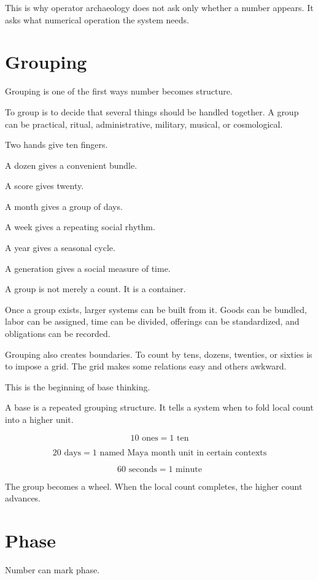 \documentclass[11pt]{book}
\begin{document}
This is why operator archaeology does not ask only whether a number appears. It asks what numerical operation the system needs.

\section{Grouping}

Grouping is one of the first ways number becomes structure.

To group is to decide that several things should be handled together. A group can be practical, ritual, administrative, military, musical, or cosmological.

Two hands give ten fingers.

A dozen gives a convenient bundle.

A score gives twenty.

A month gives a group of days.

A week gives a repeating social rhythm.

A year gives a seasonal cycle.

A generation gives a social measure of time.

A group is not merely a count. It is a container.

Once a group exists, larger systems can be built from it. Goods can be bundled, labor can be assigned, time can be divided, offerings can be standardized, and obligations can be recorded.

Grouping also creates boundaries. To count by tens, dozens, twenties, or sixties is to impose a grid. The grid makes some relations easy and others awkward.

This is the beginning of base thinking.

A base is a repeated grouping structure. It tells a system when to fold local count into a higher unit.

\[
10 \text{ ones} = 1 \text{ ten}
\]

\[
20 \text{ days} = 1 \text{ named Maya month unit in certain contexts}
\]

\[
60 \text{ seconds} = 1 \text{ minute}
\]

The group becomes a wheel. When the local count completes, the higher count advances.

\section{Phase}

Number can mark phase.
\end{document}
